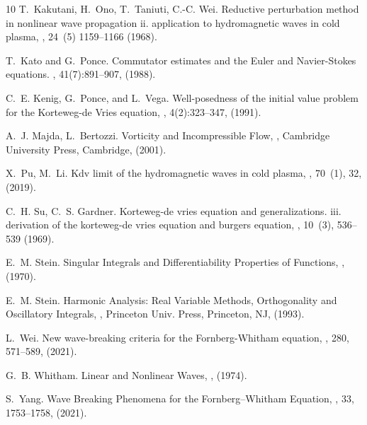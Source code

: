 \documentclass[final,11pt,a4paper,reqno]{amsart}
\theoremstyle{definition}
\begin{document}
\begin{footnotesize}
\begin{thebibliography}{10}
T.~Kakutani, H.~Ono, T.~Taniuti, C.-C. Wei. Reductive perturbation method in
nonlinear wave propagation ii. application to hydromagnetic waves in cold
plasma, 
, 24~(5) 1159--1166
(1968).

T.~Kato and G.~Ponce.
\newblock Commutator estimates and the {E}uler and {N}avier-{S}tokes equations.
, 41(7):891--907, (1988).


C.~E. Kenig, G.~Ponce, and L.~Vega.
\newblock Well-posedness of the initial value problem for the {K}orteweg-de
{V}ries equation,
, 4(2):323--347, (1991).


A.~J. Majda, L.~Bertozzi.
\newblock Vorticity and Incompressible Flow,
, Cambridge University Press, Cambridge, (2001).



X.~Pu, M.~Li. Kdv limit of the hydromagnetic waves in cold plasma, 
, 70~(1), 32, (2019).



C.~H. Su, C.~S. Gardner. Korteweg-de vries equation and generalizations. iii.
  derivation of the korteweg-de vries equation and burgers equation, 
, 10~(3), 536--539 (1969).

E.~M. Stein.
\newblock Singular Integrals and Differentiability Properties of Functions,
, (1970).

E.~M. Stein.
\newblock Harmonic Analysis: Real Variable Methods, Orthogonality and Oscillatory
Integrals,
,  Princeton Univ. Press, Princeton, NJ, (1993).

L.~Wei. New wave-breaking criteria for the Fornberg-Whitham equation,
, 280,  571--589, (2021).

G.~B. Whitham.
\newblock Linear and Nonlinear Waves,
, (1974).
		
S.~Yang. 
\newblock Wave Breaking Phenomena for the Fornberg--Whitham Equation,
, 33, 1753–1758, (2021).




\end{thebibliography}
\end{footnotesize}
\vspace{2cm}
\end{document}

